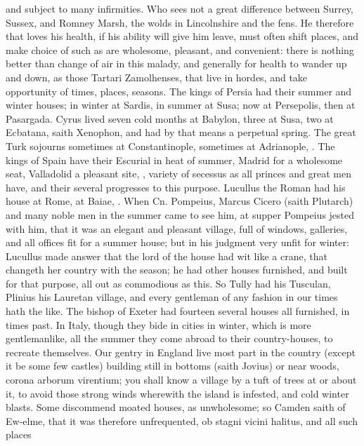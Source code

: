{and subject to many infirmities. Who sees not a great difference
between Surrey, Sussex, and Romney Marsh, the wolds in Lincolnshire and
the fens. He therefore that loves his health, if his ability will give
him leave, must often shift places, and make choice of such as are
wholesome, pleasant, and convenient: there is nothing better than
change of air in this malady, and generally for health to wander up and
down, as those Tartari Zamolhenses, that live in hordes, and take
opportunity of times, places, seasons. The kings of Persia had their
summer and winter houses; in winter at Sardis, in summer at Susa; now
at Persepolis, then at Pasargada. Cyrus lived seven cold months at
Babylon, three at Susa, two at Ecbatana, saith Xenophon, and had
by that means a perpetual spring. The great Turk sojourns sometimes at
Constantinople, sometimes at Adrianople, \etc{}. The kings of Spain have
their Escurial in heat of summer, Madrid for a wholesome seat,
Valladolid a pleasant site, \etc{}, variety of secessus as all princes and
great men have, and their several progresses to this purpose. Lucullus
the Roman had his house at Rome, at Baiae, \etc{}. When Cn. Pompeius,
Marcus Cicero (saith Plutarch) and many noble men in the summer came to
see him, at supper Pompeius jested with him, that it was an elegant and
pleasant village, full of windows, galleries, and all offices fit for a
summer house; but in his judgment very unfit for winter: Lucullus made
answer that the lord of the house had wit like a crane, that changeth
her country with the season; he had other houses furnished, and built
for that purpose, all out as commodious as this. So Tully had his
Tusculan, Plinius his Lauretan village, and every gentleman of any
fashion in our times hath the like. The bishop of Exeter had
fourteen several houses all furnished, in times past. In Italy, though
they bide in cities in winter, which is more gentlemanlike, all the
summer they come abroad to their country-houses, to recreate
themselves. Our gentry in England live most part in the country (except
it be some few castles) building still in bottoms (saith Jovius)
or near woods, corona arborum virentium; you shall know a village by a
tuft of trees at or about it, to avoid those strong winds wherewith the
island is infested, and cold winter blasts. Some discommend moated
houses, as unwholesome; so Camden saith of Ew-elme, that it was
therefore unfrequented, ob stagni vicini halitus, and all such places
}
